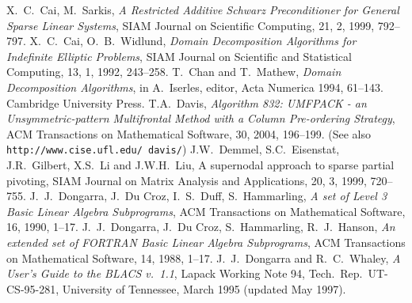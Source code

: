 \begin{thebibliography}{99}
%
%
%
X.~C.~Cai, M.~Sarkis,
{\em A Restricted Additive Schwarz Preconditioner for General Sparse Linear Systems},
SIAM Journal on Scientific Computing, 21, 2, 1999, 792--797.
%
X.~C.~Cai, O.~B.~Widlund,
{\em Domain Decomposition Algorithms for Indefinite Elliptic Problems},
SIAM Journal on Scientific and Statistical Computing, 13, 1, 1992, 243--258.
%
T.~Chan and T.~Mathew,
{\em Domain Decomposition Algorithms},
in A.~Iserles, editor, Acta Numerica 1994, 61--143.
Cambridge University Press.
%
%
T.A.~Davis, 
{\em Algorithm 832: UMFPACK - an Unsymmetric-pattern Multifrontal
Method with a Column Pre-ordering Strategy},
ACM Transactions on Mathematical Software, 30, 2004, 196--199.
(See also {\tt http://www.cise.ufl.edu/~davis/})
%
J.W.~Demmel, S.C.~Eisenstat, J.R.~Gilbert, X.S.~Li and J.W.H.~Liu,
A supernodal approach to sparse partial pivoting,
SIAM Journal on Matrix Analysis and Applications, 20, 3, 1999, 720--755.
%
J.~J.~Dongarra, J.~Du Croz, I.~S.~Duff, S.~Hammarling,
\emph{A set of Level 3 Basic Linear Algebra Subprograms},
ACM Transactions on Mathematical Software, 16, 1990, 1--17.
%
J.~J.~Dongarra, J.~Du Croz, S.~Hammarling, R.~J.~Hanson,
\emph{An extended set of FORTRAN Basic Linear Algebra Subprograms},
ACM Transactions on Mathematical Software, 14, 1988, 1--17.
%
J.~J.~Dongarra and R.~C.~Whaley,
{\em A User's Guide to the BLACS v.~1.1},
Lapack Working Note 94, Tech.\ Rep.\ UT-CS-95-281, University of
Tennessee, March 1995 (updated May 1997).
%
%

\end{thebibliography}
